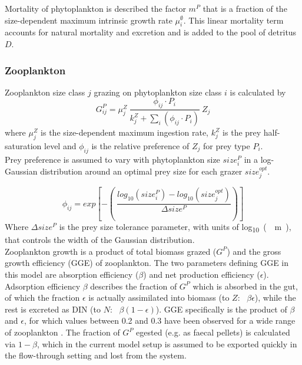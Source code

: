 \documentclass[template.tex]{subfiles}
\begin{document}
Mortality of phytoplankton is described the factor $m^P$ that is a fraction of the size-dependent maximum intrinsic growth rate $\mu_i^{\emptyset}$. This linear mortality term accounts for natural mortality and excretion and is added to the pool of detritus $D$.

\subsubsection{Zooplankton}

Zooplankton size class $j$ grazing on phytoplankton size class $i$ is calculated by
\begin{equation}
    G_{ij}^P = \mu_j^Z \ \frac{ \phi_{ij} \cdot P_i }{ k_j^Z + \sum_{i}(\phi_{ij} \cdot P_i) } \ Z_j
\end{equation}
where $\mu_j^Z$ is the size-dependent maximum ingestion rate, $k_j^Z$ is the prey half-saturation level and $\phi_{ij}$ is the relative preference of $Z_j$ for prey type $P_i$.\\

Prey preference is assumed to vary with phytoplankton size $size_i^{P}$ in a log-Gaussian distribution around an optimal prey size for each grazer $size_j^{opt}$.

\begin{equation}
    \phi_{ij} = exp \left[ -\left( \ \frac{ log_{10}(size_i^{P}) - log_{10}(size_j^{opt}) }{ \Delta size^{P} } \right) \right]
\end{equation}
Where $\Delta size^{P}$ is the prey size tolerance parameter, with units of \unit{log_{10}(\mu m)}, that controls the width of the Gaussian distribution.\\

Zooplankton growth is a product of total biomass grazed ($G^P$) and the gross growth efficiency (GGE) of zooplankton. The two parameters defining GGE in this model are absorption efficiency ($\beta$) and net production efficiency ($\epsilon$). Adsorption efficiency $\beta$ describes the fraction of $G^P$ which is absorbed in the gut, of which the fraction $\epsilon$ is actually assimilated into biomass (to $Z$: \ $\beta \epsilon$), while the rest is excreted as DIN (to $N$: \ $\beta (1-\epsilon)$). GGE specifically is the product of $\beta$ and $\epsilon$, for which values between 0.2 and 0.3 have been observed for a wide range of zooplankton  \citep{Straile1997GrossGroup}. The fraction of $G^P$ egested (e.g. as faecal pellets) is calculated via $1-\beta$, which in the current model setup is assumed to be exported quickly in the flow-through setting and lost from the system. 
\end{document}
